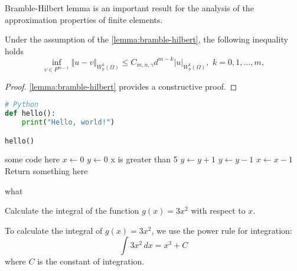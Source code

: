 \documentclass{article}
\begin{document}
\begin{note}
    Bramble-Hilbert lemma is an important result for the analysis of the approximation properties of finite elements.
\end{note}

\begin{corollary}
    Under the assumption of the \autoref{lemma:bramble-hilbert}, the following inequality holds
    \begin{equation}
        \inf_{v \in P^{m-1}} \Vert u - v \Vert_{W^k_p(\Omega)} \le C_{m,n,\gamma} d^{m-k} |u|_{W^k_p(\Omega)}, \,\, k = 0,1,\dots,m,
    \end{equation}
\end{corollary}
\begin{proof}
    \autoref{lemma:bramble-hilbert} provides a constructive proof.
\end{proof}

\begin{lstlisting}[language=Python]
# Python
def hello():
    print("Hello, world!")

hello()
\end{lstlisting}

\begin{algorithm}[H]
    \SetAlgoLined
    \SetNoFillComment
    \vspace{3mm}
    some code here\;
    $x \leftarrow 0$\;
    $y \leftarrow 0$\;
     {
        x is greater than 5 
    }
     {
        $y \leftarrow y + 1$\;
    }
     {
        $y \leftarrow y - 1$\;
    }
     {
        $x \leftarrow x - 1$\;
    }
    \Return Return something here\;
    \caption{what}
\end{algorithm}

    \begin{problem}
        Calculate the integral of the function \( g(x) = 3x^2 \) with respect to \( x \).
        \end{problem}

        \begin{solution}
        To calculate the integral of \( g(x) = 3x^2 \), we use the power rule for integration:
        \[
        \int 3x^2 \, dx = x^3 + C
        \]
        where \( C \) is the constant of integration.
        \end{solution}
\end{document}
